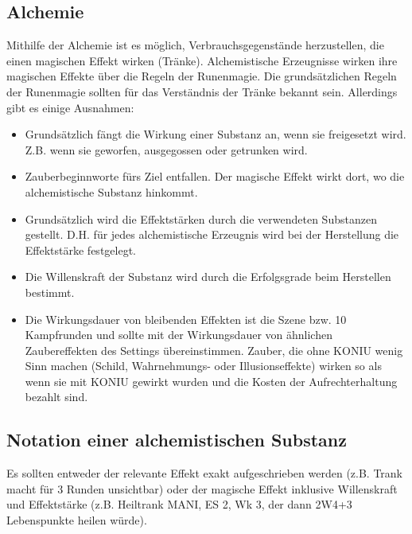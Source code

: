 \documentclass{article}
\begin{document}
\newpage

\begin{center}
\section{Alchemie}
\end{center}

Mithilfe der Alchemie ist es möglich, Verbrauchsgegenstände herzustellen, die einen magischen Effekt wirken (Tränke).
Alchemistische Erzeugnisse wirken ihre magischen Effekte über die Regeln der Runenmagie. Die grundsätzlichen Regeln
der Runenmagie sollten für das Verständnis der Tränke bekannt sein. Allerdings gibt es einige Ausnahmen:

\begin{itemize}
\item Grundsätzlich fängt die Wirkung einer Substanz an, wenn sie freigesetzt wird. Z.B. wenn sie geworfen, ausgegossen oder getrunken wird.
\item Zauberbeginnworte fürs Ziel entfallen. Der magische Effekt wirkt dort, wo die alchemistische Substanz hinkommt.
\item Grundsätzlich wird die Effektstärken durch die verwendeten Substanzen gestellt. D.H. für jedes alchemistische Erzeugnis wird bei der Herstellung die Effektstärke festgelegt.
\item Die Willenskraft der Substanz wird durch die Erfolgsgrade beim Herstellen bestimmt.
\item Die Wirkungsdauer von bleibenden Effekten ist die Szene bzw. 10 Kampfrunden und sollte mit der Wirkungsdauer von ähnlichen Zaubereffekten des Settings übereinstimmen. Zauber, die ohne KONIU wenig Sinn machen (Schild, Wahrnehmungs- oder Illusionseffekte) wirken so als wenn sie mit KONIU gewirkt wurden und die Kosten der Aufrechterhaltung bezahlt sind.
\end{itemize}

\begin{center}
\subsection{Notation einer alchemistischen Substanz}
\end{center}

Es sollten entweder der relevante Effekt exakt aufgeschrieben werden (z.B. Trank macht für 3 Runden unsichtbar) oder
der magische Effekt inklusive Willenskraft und Effektstärke (z.B. Heiltrank MANI, ES 2, Wk 3, der dann 2W4+3
Lebenspunkte heilen würde).
\end{document}

